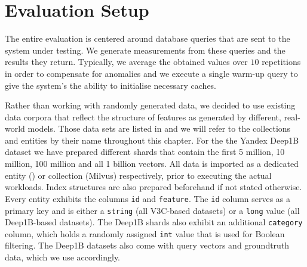 \section{Evaluation Setup}

The entire evaluation is centered around database queries that are sent to the system under testing. We generate measurements from these queries and the results they return. Typically, we average the obtained values over $10$ repetitions in order to compensate for anomalies and we execute a single warm-up query to give the system's the ability to initialise necessary caches. 

Rather than working with randomly generated data, we decided to use existing data corpora that reflect the structure of features as generated by different, real-world models. Those data sets are listed in  and we will refer to the collections and entities by their name throughout this chapter. For the the Yandex Deep1B \cite{Babenko:2016Efficient} dataset we have prepared different shards that contain the first 5 million, 10 million, 100 million and all 1 billion vectors. All data is imported as a dedicated entity (\cottontail{}) or collection (Milvus) respectively, prior to executing the actual workloads. Index structures are also prepared beforehand if not stated otherwise. Every entity exhibits the columns \texttt{id} and \texttt{feature}. The \texttt{id} column serves as a primary key and is either a \texttt{string} (all V3C-based datasets) or a \texttt{long} value (all Deep1B-based datasets). The Deep1B shards also exhibit an additional \texttt{category} column, which holds a randomly assigned \texttt{int} value that is used for Boolean filtering. The Deep1B datasets also come with query vectors and groundtruth data, which we use accordingly.

